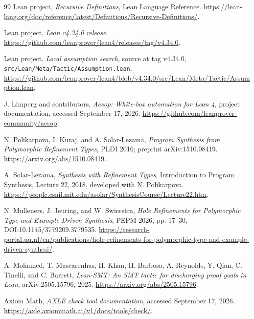 \documentclass[11pt,letterpaper]{article}
\newcommand{\pathref}[1]{\nolinkurl{#1}}
\theoremstyle{definition}
\theoremstyle{remark}
\begin{document}
\begin{thebibliography}{99}
Lean project, \emph{Recursive Definitions}, Lean Language Reference.
\url{https://lean-lang.org/doc/reference/latest/Definitions/Recursive-Definitions/}.

Lean project, \emph{Lean v4.34.0 release}.
\url{https://github.com/leanprover/lean4/releases/tag/v4.34.0}.

Lean project, \emph{Local assumption search}, source at tag v4.34.0,
\pathref{src/Lean/Meta/Tactic/Assumption.lean}.
\url{https://github.com/leanprover/lean4/blob/v4.34.0/src/Lean/Meta/Tactic/Assumption.lean}.

J. Limperg and contributors, \emph{Aesop: White-box automation for Lean 4}, project documentation, accessed September 17, 2026.
\url{https://github.com/leanprover-community/aesop}.

N. Polikarpova, I. Kuraj, and A. Solar-Lezama,
\emph{Program Synthesis from Polymorphic Refinement Types}, PLDI 2016; preprint arXiv:1510.08419.
\url{https://arxiv.org/abs/1510.08419}.

A. Solar-Lezama, \emph{Synthesis with Refinement Types}, Introduction to Program Synthesis, Lecture 22, 2018, developed with N. Polikarpova.
\url{https://people.csail.mit.edu/asolar/SynthesisCourse/Lecture22.htm}.

N. Mulleners, J. Jeuring, and W. Swierstra,
\emph{Hole Refinements for Polymorphic Type-and-Example Driven Synthesis}, PEPM 2026, pp. 17--30, DOI:10.1145/3779209.3779535.
\url{https://research-portal.uu.nl/en/publications/hole-refinements-for-polymorphic-type-and-example-driven-synthesi/}.

A. Mohamed, T. Mascarenhas, H. Khan, H. Barbosa, A. Reynolds, Y. Qian, C. Tinelli, and C. Barrett,
\emph{Lean-SMT: An SMT tactic for discharging proof goals in Lean}, arXiv:2505.15796, 2025.
\url{https://arxiv.org/abs/2505.15796}.

Axiom Math, \emph{AXLE check tool documentation}, accessed September 17, 2026.
\url{https://axle.axiommath.ai/v1/docs/tools/check/}.
\end{thebibliography}
\end{document}

